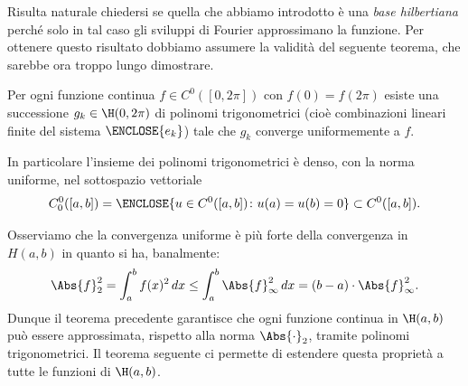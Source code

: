 Risulta naturale chiedersi se quella che abbiamo introdotto è una
\emph{base hilbertiana} perché solo in tal caso gli sviluppi di Fourier
approssimano la funzione.
Per ottenere questo risultato dobbiamo assumere la validità del seguente
teorema, che sarebbe ora troppo lungo dimostrare.

\begin{theorem}
Per ogni funzione continua $f\in C^0([0,2\pi])$
con $f(0)=f(2\pi)$ esiste una successione $g_k\in \H(0,2\pi)$ 
di polinomi trigonometrici
(cioè combinazioni lineari finite del sistema $\ENCLOSE{e_k}$)
tale che $g_k$ converge uniformemente a $f$.

In particolare l'insieme dei polinomi trigonometrici
è denso, con la norma uniforme,
nel sottospazio vettoriale
\[
  C^0_0([a,b]) 
  = \ENCLOSE{u\in C^0([a,b])\colon u(a)=u(b)=0}
  \subset C^0([a,b]).
\]
\end{theorem}

Osserviamo che la convergenza uniforme è più forte della convergenza
in $H(a,b)$ in quanto si ha, banalmente:
\[
  \Abs{f}_2^2 = \int_a^b f(x)^2\, dx
  \le \int_a^b \Abs{f}_\infty^2\, dx
  = (b-a) \cdot \Abs{f}_\infty^2.
\]
Dunque il teorema precedente garantisce che ogni funzione continua
in $\H(a,b)$ può essere approssimata, rispetto alla norma $\Abs{\cdot}_2$,
tramite polinomi trigonometrici. Il teorema seguente ci permette
di estendere questa proprietà a tutte le funzioni di $\H(a,b)$.


